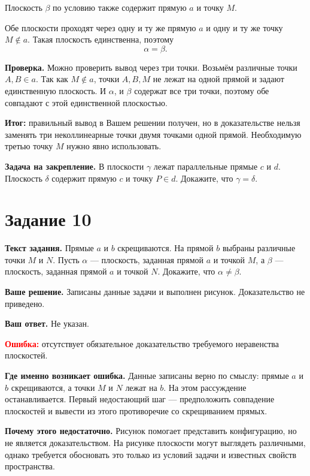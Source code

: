\documentclass[12pt,a4paper]{article}
\begin{document}
Плоскость $\beta$ по условию также содержит прямую $a$ и точку $M$.

Обе плоскости проходят через одну и ту же прямую $a$ и одну и ту же точку $M\notin a$. Такая плоскость единственна, поэтому
\[
\alpha=\beta.
\]

\textbf{Проверка.}
Можно проверить вывод через три точки. Возьмём различные точки $A,B\in a$. Так как $M\notin a$, точки $A,B,M$ не лежат на одной прямой и задают единственную плоскость. И $\alpha$, и $\beta$ содержат все три точки, поэтому обе совпадают с этой единственной плоскостью.

\textcolor{teal!60!black}{\textbf{Итог:}} правильный вывод в Вашем решении получен, но в доказательстве нельзя заменять три неколлинеарные точки двумя точками одной прямой. Необходимую третью точку $M$ нужно явно использовать.

\textbf{Задача на закрепление.}
В плоскости $\gamma$ лежат параллельные прямые $c$ и $d$. Плоскость $\delta$ содержит прямую $c$ и точку $P\in d$. Докажите, что $\gamma=\delta$.

\newpage
{}\label{task:10}
\section*{Задание 10}

\textbf{Текст задания.}
Прямые $a$ и $b$ скрещиваются. На прямой $b$ выбраны различные точки $M$ и $N$. Пусть $\alpha$ --- плоскость, заданная прямой $a$ и точкой $M$, а $\beta$ --- плоскость, заданная прямой $a$ и точкой $N$. Докажите, что $\alpha\ne\beta$.

\textbf{Ваше решение.}
Записаны данные задачи и выполнен рисунок. Доказательство не приведено.

\textbf{Ваш ответ.}
Не указан.

\textcolor{red}{\textbf{Ошибка:}} отсутствует обязательное доказательство требуемого неравенства плоскостей.

\textbf{Где именно возникает ошибка.}
Данные записаны верно по смыслу: прямые $a$ и $b$ скрещиваются, а точки $M$ и $N$ лежат на $b$. На этом рассуждение останавливается. Первый недостающий шаг --- предположить совпадение плоскостей и вывести из этого противоречие со скрещиванием прямых.

\textbf{Почему этого недостаточно.}
Рисунок помогает представить конфигурацию, но не является доказательством. На рисунке плоскости могут выглядеть различными, однако требуется обосновать это только из условий задачи и известных свойств пространства.
\end{document}
